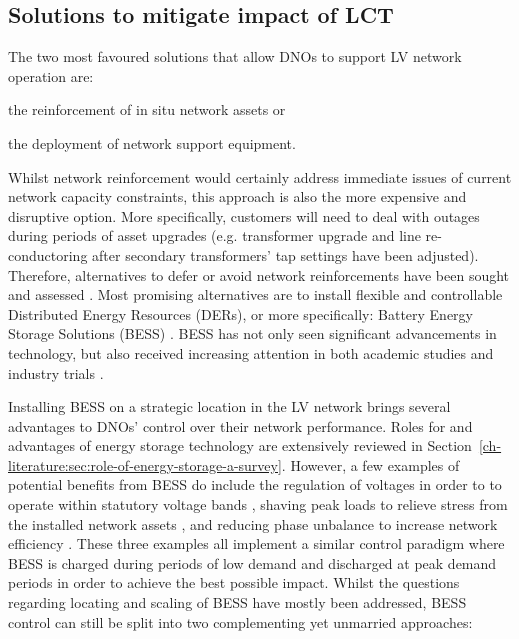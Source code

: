 \subsection{Solutions to mitigate impact of LCT}
\label{ch-introduction:subsec:solutions-to-mitigate-impact-of-lct}

The two most favoured solutions that allow DNOs to support LV network operation are:
\begin{enumerate*}
	\item the reinforcement of in situ network assets or
	\item the deployment of network support equipment.
\end{enumerate*}
Whilst network reinforcement would certainly address immediate issues of current network capacity constraints, this approach is also the more expensive and disruptive option.
More specifically, customers will need to deal with outages during periods of asset upgrades (e.g. transformer upgrade and line re-conductoring after secondary transformers' tap settings have been adjusted).
Therefore, alternatives to defer or avoid network reinforcements have been sought and assessed \cite{Harrison2007, Zangs2016a, VanderKlauw2016d, Greenwood2017}.
Most promising alternatives are to install flexible and controllable Distributed Energy Resources (DERs), or more specifically: Battery Energy Storage Solutions (BESS) \cite{Wade2010}.
BESS has not only seen significant advancements in technology, but also received increasing attention in both academic studies and industry trials \cite{Palizban2016}.

Installing BESS on a strategic location in the LV network brings several advantages to DNOs' control over their network performance.
Roles for and advantages of energy storage technology are extensively reviewed in Section~\ref{ch-literature:sec:role-of-energy-storage-a-survey}.
However, a few examples of potential benefits from BESS do include the regulation of voltages in order to to operate within statutory voltage bands \cite{Yang2014}, shaving peak loads to relieve stress from the installed network assets \cite{Bennett2015}, and reducing phase unbalance to increase network efficiency \cite{Wang2015b}.
These three examples all implement a similar control paradigm where BESS is charged during periods of low demand and discharged at peak demand periods in order to achieve the best possible impact.
Whilst the questions regarding locating and scaling of BESS have mostly been addressed, BESS control can still be split into two complementing yet unmarried approaches:

